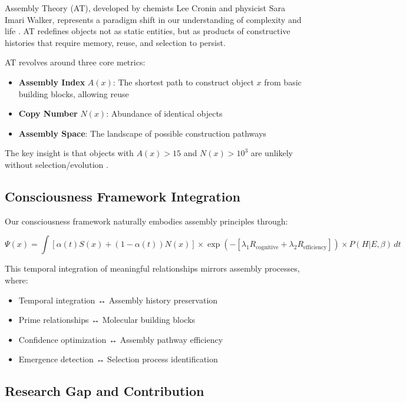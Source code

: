 \documentclass[11pt,a4paper]{article}
\begin{document}
Assembly Theory (AT), developed by chemists Lee Cronin and physicist Sara Imari Walker, represents a paradigm shift in our understanding of complexity and life \cite{walker2023assembly, cronin2024chemputer}. AT redefines objects not as static entities, but as products of constructive histories that require memory, reuse, and selection to persist.

AT revolves around three core metrics:
\begin{itemize}
    \item \textbf{Assembly Index} \( A(x) \): The shortest path to construct object \( x \) from basic building blocks, allowing reuse
    \item \textbf{Copy Number} \( N(x) \): Abundance of identical objects
    \item \textbf{Assembly Space}: The landscape of possible construction pathways
\end{itemize}

The key insight is that objects with \( A(x) > 15 \) and \( N(x) > 10^3 \) are unlikely without selection/evolution \cite{walker2023assembly}.

\subsection{Consciousness Framework Integration}
\label{subsec:consciousness}

Our consciousness framework \cite{oates2025consciousness} naturally embodies assembly principles through:

\begin{equation}
\Psi(x) = \int [\alpha(t) S(x) + (1-\alpha(t)) N(x)] \times \exp(-[\lambda_1 R_\text{cognitive} + \lambda_2 R_\text{efficiency}]) \times P(H|E,\beta) \, dt
\label{eq:psi_consciousness}
\end{equation}

This temporal integration of meaningful relationships mirrors assembly processes, where:
\begin{itemize}
    \item Temporal integration ↔ Assembly history preservation
    \item Prime relationships ↔ Molecular building blocks
    \item Confidence optimization ↔ Assembly pathway efficiency
    \item Emergence detection ↔ Selection process identification
\end{itemize}

\subsection{Research Gap and Contribution}
\label{subsec:gap}
\end{document}
